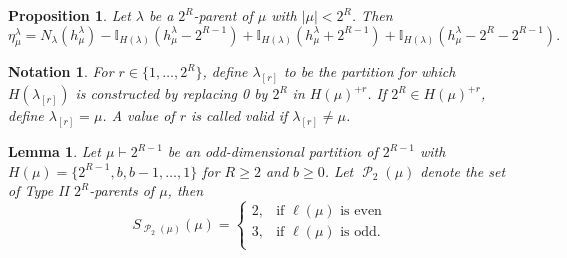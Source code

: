 \documentclass[10pt,a4paper]{amsart}
\newtheorem{proposition}{Proposition}
\newtheorem{notation}{Notation}
\newtheorem{lemma}{Lemma}
\newcommand{\la}{\lambda}
\DeclareMathOperator{\p}{\mathcal{P}}
\begin{document}
\begin{proposition}\label{prop:inversions}
Let $\lambda$ be a $2^R$-parent of $\mu$ with $|\mu| < 2^R$.  Then
\[
\eta^{\lambda}_{\mu} = N_{\lambda}(h^\lambda_\mu) - \mathbb{I}_{H(\lambda)}(h^\lambda_\mu - 2^{R-1}) +  \mathbb{I}_{H(\lambda)}(h^\lambda_\mu + 2^{R-1}) + \mathbb{I}_{H(\lambda)}(h^\lambda_\mu - 2^R-2^{R-1}). 
\]
\end{proposition}

\begin{notation}\label{notn:valid-values}
For $r \in \{1,\ldots, 2^R\}$, define $\lambda_{[r]}$ to be the partition for which $H(\la_{[r]})$ is constructed by replacing 0 by $2^R$ in $H(\mu)^{+r}$. If $2^R\in H(\mu)^{+r}$, define $\lambda_{[r]} =\mu$. A value of $r$ is called \textit{valid} if $\lambda_{[r]} \neq \mu$.
\end{notation}

\begin{lemma}\label{lem:8}
Let $\mu\vdash 2^{R-1}$ be an odd-dimensional partition of $2^{R-1}$ with $H(\mu) = \{2^{R-1},b, b-1,\ldots, 1\}$ for $R\geq 2$ and $b\geq 0$. Let $\p_2(\mu)$ denote the set of Type II $2^R$-parents of $\mu$, then 
\[
S_{\p_2(\mu)}({\mu}) = \begin{cases}
2 ,& \text{if }\ell(\mu)\text{ is even}\\
3, & \text{if }\ell(\mu) \text{ is odd}.\\
\end{cases}
\]
\end{lemma}
\end{document}
